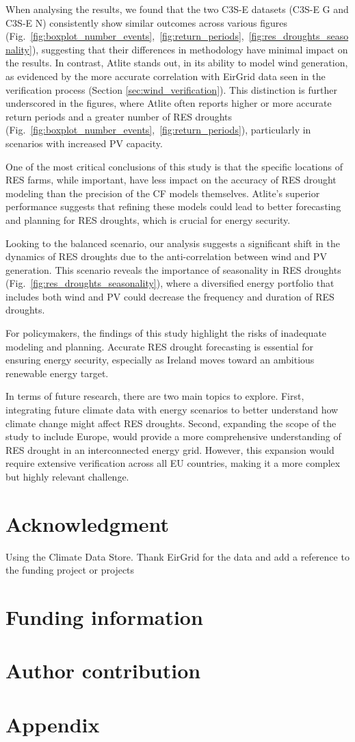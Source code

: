 \documentclass[a4paper, 11pt]{article}
\begin{document}
When analysing the results, we found that the two C3S-E datasets (C3S-E G and C3S-E N) consistently show similar outcomes across various figures (Fig.~\ref{fig:boxplot_number_events},~\ref{fig:return_periods},~\ref{fig:res_droughts_seasonality}), suggesting that their differences in methodology have minimal impact on the results. In contrast, Atlite stands out, in its ability to model wind generation, as evidenced by the more accurate correlation with EirGrid data seen in the verification process (Section \ref{sec:wind_verification}). This distinction is further underscored in the figures, where Atlite often reports higher or more accurate return periods and a greater number of RES droughts (Fig.~\ref{fig:boxplot_number_events},~\ref{fig:return_periods}), particularly in scenarios with increased PV capacity.

One of the most critical conclusions of this study is that the specific locations of RES farms, while important, have less impact on the accuracy of RES drought modeling than the precision of the CF models themselves. Atlite's superior performance suggests that refining these models could lead to better forecasting and planning for RES droughts, which is crucial for energy security.

Looking to the balanced scenario, our analysis suggests a significant shift in the dynamics of RES droughts due to the anti-correlation between wind and PV generation. This scenario reveals the importance of seasonality in RES droughts (Fig.~\ref{fig:res_droughts_seasonality}), where a diversified energy portfolio that includes both wind and PV could decrease the frequency and duration of RES droughts.

For policymakers, the findings of this study highlight the risks of inadequate modeling and planning. Accurate RES drought forecasting is essential for ensuring energy security, especially as Ireland moves toward an ambitious renewable energy target.

In terms of future research, there are two main topics to explore. First, integrating future climate data with energy scenarios to better understand how climate change might affect RES droughts. Second, expanding the scope of the study to include Europe, would provide a more comprehensive understanding of RES drought in an interconnected energy grid. However, this expansion would require extensive verification across all EU countries, making it a more complex but highly relevant challenge.

\newpage
\section{Acknowledgment}
Using the Climate Data Store. Thank EirGrid for the data and add a reference to the funding project or projects

\section{Funding information}

\section{Author contribution}



\newpage
\section*{Appendix}
\end{document}
